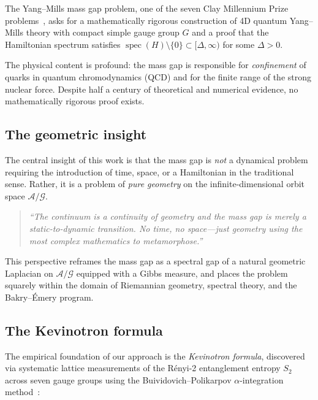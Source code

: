 \documentclass[11pt,a4paper]{amsart}
\theoremstyle{definition}
\theoremstyle{remark}
\newcommand{\calA}{\mathcal{A}}
\newcommand{\calG}{\mathcal{G}}
\DeclareMathOperator{\spec}{spec}
\begin{document}
The Yang--Mills mass gap problem, one of the seven Clay Millennium Prize
problems~\cite{JaffeWitten2000}, asks for a mathematically rigorous
construction of 4D quantum Yang--Mills theory with compact simple gauge group
$G$ and a proof that the Hamiltonian spectrum satisfies
$\spec(H) \setminus \{0\} \subset [\Delta, \infty)$ for some $\Delta > 0$.

The physical content is profound: the mass gap is responsible for
\emph{confinement} of quarks in quantum chromodynamics (QCD) and for the
finite range of the strong nuclear force. Despite half a century of
theoretical and numerical evidence, no mathematically rigorous proof exists.

\subsection{The geometric insight}

The central insight of this work is that the mass gap is \emph{not} a
dynamical problem requiring the introduction of time, space, or a
Hamiltonian in the traditional sense. Rather, it is a problem of
\emph{pure geometry} on the infinite-dimensional orbit space
$\calA/\calG$.

\begin{quote}
\emph{``The continuum is a continuity of geometry and the mass gap is
merely a static-to-dynamic transition. No time, no space---just geometry
using the most complex mathematics to metamorphose.''}
\end{quote}

This perspective reframes the mass gap as a spectral gap of a natural
geometric Laplacian on $\calA/\calG$ equipped with a Gibbs measure,
and places the problem squarely within the domain of Riemannian geometry,
spectral theory, and the Bakry--\'Emery program.

\subsection{The Kevinotron formula}

The empirical foundation of our approach is the \emph{Kevinotron formula},
discovered via systematic lattice measurements of the R\'enyi-2 entanglement
entropy $S_2$ across seven gauge groups using the Buividovich--Polikarpov
$\alpha$-integration method~\cite{BuividovichPolikarpov2008}:
\end{document}
